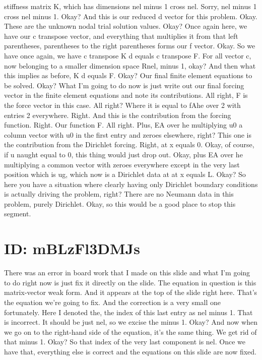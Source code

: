 \documentclass[10pt]{article}
\begin{document}
stiffness matrix K, which has dimensions nel minus 1 cross nel. Sorry, nel minus 1 cross nel minus 1. Okay? And this is our reduced d vector for this problem. Okay. These are the unknown nodal trial solution values. Okay? Once again here, we have our c transpose vector, and everything that multiplies it from that left parentheses, parentheses to the right parentheses forms our f vector. Okay. So we have once again, we have c transpose K d equals c transpose F. For all vector c, now belonging to a smaller dimension space Rnel, minus 1, okay? And then what this implies as before, K d equals F. Okay? Our final finite element equations to be solved. Okay? What I'm going to do now is just write out our final forcing vector in the finite element equations and note its contributions. All right, F is the force vector in this case. All right? Where it is equal to fAhe over 2 with entries 2 everywhere. Right. And this is the contribution from the forcing function. Right. Our function F. All right. Plus, EA over he multiplying u0 a column vector with u0 in the first entry and zeroes elsewhere, right? This one is the contribution from the Dirichlet forcing. Right, at x equals 0. Okay, of course, if u naught equal to 0, this thing would just drop out. Okay, plus EA over he multiplying a common vector with zeroes everywhere except in the very last position which is ug, which now is a Dirichlet data at  at x equals L. Okay? So here you have a situation where clearly having only Dirichlet boundary conditions is actually driving the problem, right? There are no Neumann data in this problem, purely Dirichlet. Okay, so this would be a good place to stop this segment.

\section*{ID: mBLzFl3DMJs}
There was an error in board work that I made on this slide and what I'm going to do right now is just fix it directly on the slide. The equation in question is this matrix-vector weak form. And it appears at the top of the slide right here. That's the equation we're going to fix. And the correction is a very small one fortunately. Here I denoted the, the index of this last entry as nel minus 1. That is incorrect. It should be just nel, so we excise the minus 1. Okay? And now when we go on to the right-hand side of the equation, it's the same thing. We get rid of that minus 1. Okay? So that index of the very last component is nel. Once we have that, everything else is correct and the equations on this slide are now fixed.
\end{document}
